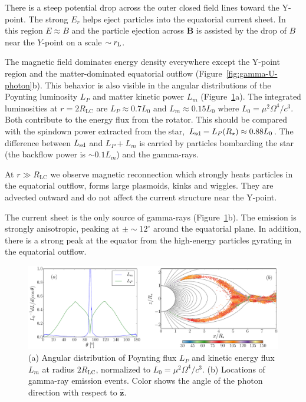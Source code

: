 There is a steep potential drop across the outer closed field lines toward the
Y-point. The strong $E_r$ helps eject particles into the equatorial current sheet.
In this region $E\approx B$ and the particle ejection across $\mathbf{B}$ is assisted by
the drop of $B$ near the $Y$-point on a scale $\sim r_{\rm L}$.

The magnetic field dominates energy density everywhere except the Y-point region
and the matter-dominated equatorial outflow (Figure~\ref{fig:gamma-U-photon}b).
This behavior is also visible in the angular distributions of the Poynting luminosity
$L_P$ and matter kinetic power $L_m$ (Figure~\ref{fig:fluxes}a).
The integrated luminosities at $r=2R_\mathrm{LC}$ are $L_P\approx 0.7 L_0$ and
$L_m\approx 0.15 L_0$ where $L_0=\mu^2\Omega^4/c^3$.
Both contribute to the energy flux from the rotator.
This should be compared with the spindown power extracted from the star,
$L_{\rm sd}=L_P(R_{\star})\approx 0.88L_0$.
The difference between $L_{\rm sd}$ and
$L_P+L_m$ is carried by particles bombarding the star
(the backflow power is $\sim 0.1L_m$) and the gamma-rays.

At $r\gg R_\mathrm{LC}$ we observe magnetic reconnection which strongly heats
particles in the equatorial outflow, forms large plasmoids, kinks and wiggles.
They are advected outward and do not affect the current structure near the Y-point.

The current sheet is the only source of gamma-rays (Figure~\ref{fig:fluxes}b).
The emission is strongly anisotropic, peaking at
$\pm \sim 12^{\circ}$ around the equatorial plane. In addition,
there is a strong peak at the equator from the high-energy
particles gyrating in the equatorial outflow.

\begin{figure}[t]
    \hspace*{-0.6cm}
    \includegraphics[width=1.07\textwidth]{pics/chap3/figure4.eps}
    \caption{\small
        (a) Angular distribution of
        Poynting flux $L_P$ and kinetic energy flux $L_m$ at radius
        $2R_\mathrm{LC}$, normalized to  $L_0 = \mu^2\Omega^4/c^3$.
        (b) Locations of gamma-ray emission
        events. Color shows the angle of the photon
        direction with respect to $\hat{\mathbf{z}}$.
          }
    \label{fig:fluxes}
\end{figure}


